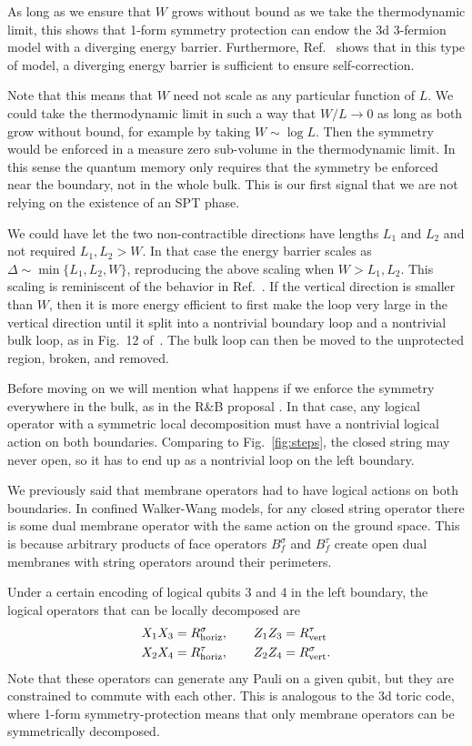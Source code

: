As long as we ensure that $W$ grows without bound as we take the thermodynamic limit, this shows that 1-form symmetry protection can endow the 3d 3-fermion model with a diverging energy barrier. Furthermore, Ref.~\cite{RobertsBartlett2020} shows that in this type of model, a diverging energy barrier is sufficient to ensure self-correction.

Note that this means that $W$ need not scale as any particular function of $L$. We could take the thermodynamic limit in such a way that $W/L\to 0$ as long as both grow without bound, for example by taking $W\sim \log L$. Then the symmetry would be enforced in a measure zero sub-volume in the thermodynamic limit. In this sense the quantum memory only requires that the symmetry be enforced near the boundary, not in the whole bulk. This is our first signal that we are not relying on the existence of an SPT phase.

We could have let the two non-contractible directions have lengths $L_1$ and $L_2$ and not required $L_1, L_2>W$. In that case the energy barrier scales as $\Delta\sim \min\{L_1,L_2,W\}$, reproducing the above scaling when $W>L_1,L_2$. 
This scaling is reminiscent of the behavior in Ref.~\cite{RobertsBartlett2020}. If the vertical direction is smaller than $W$, then it is more energy efficient to first make the loop very large in the vertical direction until it split into a nontrivial boundary loop and a nontrivial bulk loop, as in Fig.~12 of~\cite{RobertsBartlett2020}. The bulk loop can then be moved to the unprotected region, broken, and removed.

Before moving on we will mention what happens if we enforce the symmetry everywhere in the bulk, as in the R\&B proposal \cite{RobertsBartlett2020}. In that case, any logical operator with a symmetric local decomposition must have a nontrivial logical action on both boundaries. Comparing to Fig.~\ref{fig:steps}, the closed string may never open, so it has to end up as a nontrivial loop on the left boundary. 

We previously said that membrane operators had to have logical actions on both boundaries. In confined Walker-Wang models, for any closed string operator there is some dual membrane operator with the same action on the ground space. This is because arbitrary products of face operators $B_f^\sigma$ and $B_f^\tau$ create open dual membranes with string operators around their perimeters.

Under a certain encoding of logical qubits 3 and 4 in the left boundary, the logical operators that can be locally decomposed are 
\begin{align}
X_1X_3 &= R^\sigma_{\text{horiz}},\qquad Z_1Z_3 = R^\tau_{\text{vert}}\nonumber\\
X_2X_4 &= R^\tau_{\text{horiz}}, \qquad Z_2Z_4 = R^\sigma_{\text{vert}}.
\label{eqn:fullenc}
\end{align}
Note that these operators can generate any Pauli on a given qubit, but they are constrained to commute with each other. This is analogous to the 3d toric code, where 1-form symmetry-protection means that only membrane operators can be symmetrically decomposed.

